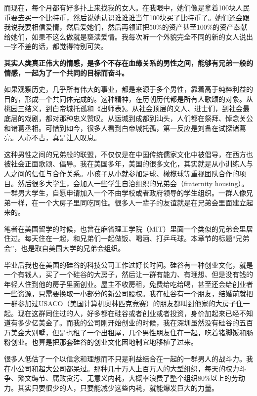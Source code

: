 而现在，每个月都有好多扑上来找我的女人。在我眼中，她们像是拿着100块人民币要去买一个比特币，然后说她认识谁谁谁当年100块买了比特币了。她们还会跟我说我要相信爱情，然后爱她们，然后再领证把50\%的资产甚至100\%的资产奉献给她们，如果不这么做就是亵渎爱情。我每次听一个外貌完全不同的新的女人说出一字不差的话，都觉得特别可笑。

\textbf{其实人类真正伟大的情感，是多个不存在血缘关系的男性之间，能够有兄弟一般的情感，一起为了一个共同的目标而奋斗。}

如果观察历史，几乎所有伟大的事业，都是来源于多个男性，靠着高于纯粹利益的目的，形成一个共同体完成的。这种精神，在历朝历代都是所有人歌颂的对象。从桃园三结义，到白帝城托孤和《出师表》。从社会顶层的文人、进士们，到社会最底层的戏剧，都对那种忠义赞叹。从运城到成都到汕头，人们都在祭拜、悼念关公和诸葛丞相。可惜到如今，很多人看到白帝城托孤，第一反应是刘备在试探诸葛亮。人心不古，真是让人叹息。

这种男性之间的兄弟般的联盟，不仅仅是在中国传统儒家文化中被倡导，在西方也被社会正面歌颂、倡导。我在美国多年，美国的很多文化，其实就是从小训练人与人之间的信任与合作关系。小孩子从小就参加足球、橄榄球等重视团队合作的项目。然后很多大学生，会加入一些学生自治组织的兄弟会（fraternity housing）。一群男大学生，自愿申请加入一个不由学校或者政府领导的学生组织。一群人像兄弟一样，在一个大房子里同吃同住。很多人一辈子的友谊就是在兄弟会里面建立起来的。

笔者在美国留学的时候，也曾在麻省理工学院（MIT）里面一个类似的兄弟会里居住过。每天住在一起，和兄弟们一起做饭、喝酒、打乒乓球。本章节的标题``兄弟会''，也是取自美国大学的兄弟会组织。

毕业后我也在美国的硅谷的科技公司工作过好长时间。硅谷有一种创业文化，就是一个有钱人，买了一个硅谷的大房子，然后让一群有能力、有理想、但是没有钱的年轻人住到他的房子里面创业。屋主不收房租，免费给吃给喝，甚至还会给创业者一些资源，只需要换取一小部分的新公司股权。我在硅谷有一个朋友，结婚前就把一群参加过USACO（美国计算机奥林匹克竞赛）的朋友都叫到他家的大房子住一起。现在这群同住过的人，好多都在硅谷或者创业或者投资，身价加起来已经不知道有多少亿美金了。而我的公司刚开始创业的时候，我在深圳虽然没有硅谷的五百万美金大别墅，但是也租了一个出租屋，几个男性朋友住在一起，吃着猪脚饭和肠粉创业。也算是把那套硅谷的创业文化因地制宜地移植了过来。

很多人低估了一个以信念和理想而不只是利益结合在一起的一群男人的战斗力。我在小公司和超大公司都呆过。那种几十万人上百万人的大型组织，每天的权力斗争、繁文缛节、腐败贪污、无意义内耗，大概率浪费了整个组织80\%以上的劳动力。其实只要很少的人，只要能减少这些内耗，就能爆发巨大的力量。

